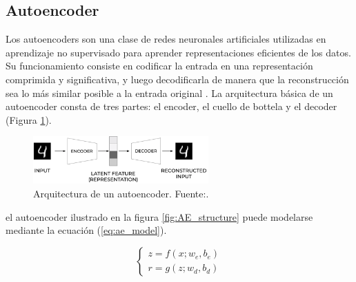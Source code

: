 \subsection{Autoencoder}

Los autoencoders son una clase de redes neuronales artificiales utilizadas en aprendizaje no supervisado para aprender representaciones eficientes de los datos. Su funcionamiento consiste en codificar la entrada en una representación comprimida y significativa, y luego decodificarla de manera que la reconstrucción sea lo más similar posible a la entrada original \citep{lopes2022effective}. La arquitectura básica de un autoencoder consta de tres partes: el encoder, el cuello de bottela y el decoder (Figura \ref{fig:AE_architecture}). 


\begin{figure}[h]
    \centering
    \includegraphics[width=0.6\textwidth]{img/AE4.png}
    \caption{Arquitectura de un autoencoder. Fuente:\citep{autoencoderImage}.}
    \label{fig:AE_architecture}
\end{figure}




el autoencoder ilustrado en la figura \ref{fig:AE_structure} puede modelarse mediante la ecuación (\ref{eq:ae_model}).

\begin{equation}
\begin{cases}
z = f(x; w_e, b_e) \\
r = g(z; w_d, b_d)
\end{cases}
\label{eq:ae_model}
\end{equation}

